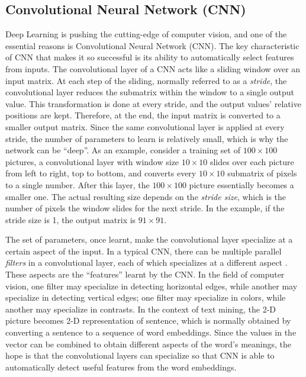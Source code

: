 \subsection{Convolutional Neural Network (CNN)}

Deep Learning is pushing the cutting-edge of computer vision, and one of the essential reasons is Convolutional Neural Network (CNN). The key characteristic of CNN that makes it so successful is its ability to automatically select features from inputs. The convolutional layer of a CNN acts like a sliding window over an input matrix. At each step of the sliding, normally referred to as a {\em stride}, the convolutional layer reduces the submatrix within the window to a single output value. This transformation is done at every stride, and the output values' relative positions are kept. Therefore, at the end, the input matrix is converted to a smaller output matrix. Since the same convolutional layer is applied at every stride, the number of parameters to learn is relatively small, which is why the network can be ``deep''. As an example, consider a training set of $100 \times 100$ pictures, a convolutional layer with window size $10 \times 10$ slides over each picture from left to right, top to bottom, and converts every $10 \times 10$ submatrix of pixels to a single number. After this layer, the $100 \times 100$ picture essentially becomes a smaller one. The actual resulting size depends on the {\em stride size}, which is the number of pixels the window slides for the next stride. In the example, if the stride size is 1, the output matrix is $91 \times 91$.

The set of parameters, once learnt, make the convolutional layer specialize at a certain aspect of the input. In a typical CNN, there can be multiple parallel {\em filters} in a convolutional layer, each of which specializes at a different aspect \cite{krizhevsky2012}. These aspects are the ``features'' learnt by the CNN. In the field of computer vision, one filter may specialize in detecting horizontal edges, while another may specialize in detecting vertical edges; one filter may specialize in colors, while another may specialize in contrasts. In the context of text mining, the 2-D picture becomes 2-D representation of sentence, which is normally obtained by converting a sentence to a sequence of word embeddings. Since the values in the vector can be combined to obtain different aspects of the word's meanings, the hope is that the convolutional layers can specialize so that CNN is able to automatically detect useful features from the word embeddings. 

